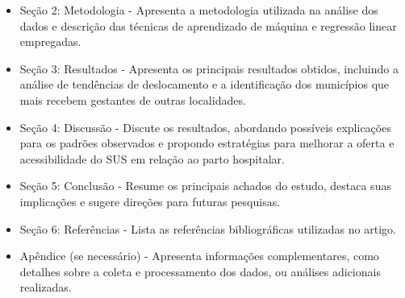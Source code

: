\documentclass{article}
\begin{document}
\begin{itemize}
    \item Seção 2: Metodologia - Apresenta a metodologia utilizada na análise dos dados e descrição das técnicas de aprendizado de máquina e regressão linear empregadas.
    \item Seção 3: Resultados - Apresenta os principais resultados obtidos, incluindo a análise de tendências de deslocamento e a identificação dos municípios que mais recebem gestantes de outras localidades.
    \item Seção 4: Discussão - Discute os resultados, abordando possíveis explicações para os padrões observados e propondo estratégias para melhorar a oferta e acessibilidade do SUS em relação ao parto hospitalar.
    \item Seção 5: Conclusão - Resume os principais achados do estudo, destaca suas implicações e sugere direções para futuras pesquisas.
    \item Seção 6: Referências - Lista as referências bibliográficas utilizadas no artigo.
    \item Apêndice (se necessário) - Apresenta informações complementares, como detalhes sobre a coleta e processamento dos dados, ou análises adicionais realizadas.
\end{itemize}
\end{document}
